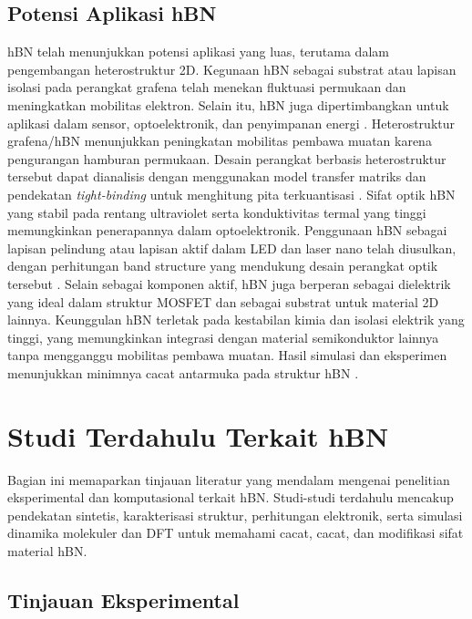 \subsection{Potensi Aplikasi hBN}
hBN telah menunjukkan potensi aplikasi yang luas, terutama dalam pengembangan heterostruktur 2D.
Kegunaan hBN sebagai substrat atau lapisan isolasi pada perangkat grafena telah menekan fluktuasi permukaan dan meningkatkan mobilitas elektron.
Selain itu, hBN juga dipertimbangkan untuk aplikasi dalam sensor, optoelektronik, dan penyimpanan energi \cite{Wang2017}.
Heterostruktur grafena/hBN menunjukkan peningkatan mobilitas pembawa muatan karena pengurangan hamburan permukaan.
Desain perangkat berbasis heterostruktur tersebut dapat dianalisis dengan menggunakan model transfer matriks dan pendekatan \emph{tight-binding} untuk menghitung pita terkuantisasi \cite{CastroNeto2009}.
Sifat optik hBN yang stabil pada rentang ultraviolet serta konduktivitas termal yang tinggi memungkinkan penerapannya dalam optoelektronik.
Penggunaan hBN sebagai lapisan pelindung atau lapisan aktif dalam LED dan laser nano telah diusulkan, dengan perhitungan band structure yang mendukung desain perangkat optik tersebut \cite{Zhang2020}.
Selain sebagai komponen aktif, hBN juga berperan sebagai dielektrik yang ideal dalam struktur MOSFET dan sebagai substrat untuk material 2D lainnya.
Keunggulan hBN terletak pada kestabilan kimia dan isolasi elektrik yang tinggi, yang memungkinkan integrasi dengan material semikonduktor lainnya tanpa mengganggu mobilitas pembawa muatan.
Hasil simulasi dan eksperimen menunjukkan minimnya cacat antarmuka pada struktur hBN \cite{Bhimanapati2016}.

\section{Studi Terdahulu Terkait hBN}
Bagian ini memaparkan tinjauan literatur yang mendalam mengenai penelitian eksperimental dan komputasional terkait hBN.
Studi-studi terdahulu mencakup pendekatan sintetis, karakterisasi struktur, perhitungan elektronik, serta simulasi dinamika molekuler dan DFT untuk memahami cacat, cacat, dan modifikasi sifat material hBN.

\subsection{Tinjauan Eksperimental}

